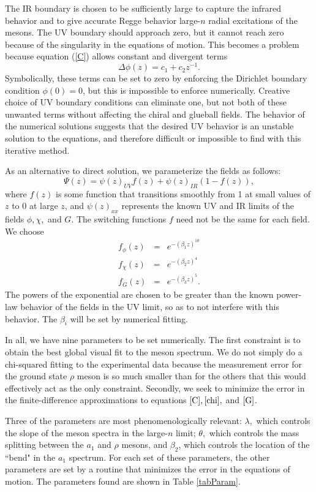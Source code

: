 \documentclass[aps,prd,12pt,nofootinbib]{revtex4}
\newcommand{\be}{\begin{equation}}
\newcommand{\ee}{\end{equation}}
\newcommand{\ba}{\begin{eqnarray}}
\newcommand{\ea}{\end{eqnarray}}
\begin{document}
The IR boundary is chosen to be sufficiently large to capture the infrared behavior and to give accurate Regge behavior large-$n$ radial excitations of the mesons. 
The UV boundary should approach zero, but it cannot reach zero because of the singularity in the equations of motion. 
This becomes a problem because equation (\ref{C}) allows constant and divergent terms 
\be
\Delta \phi(z) = c_1 + c_2 z^{-1}.
\ee
Symbolically, these terms can be set to zero by enforcing the Dirichlet boundary condition $\phi(0)=0$, but this is impossible to enforce numerically. 
Creative choice of UV boundary conditions can eliminate one, but not both of these unwanted terms without affecting the chiral and glueball fields. 
The behavior of the numerical solutions suggests that the desired UV behavior is an unstable solution to the equations, and therefore difficult or impossible to find with this iterative method.

As an alternative to direct solution, we parameterize the fields as follows:
\be
\Psi(z) = \psi(z)_{UV} f(z) + \psi(z)_{IR} \left(1-f(z)\right),
\ee
where $f(z)$ is some function that transitions smoothly from 1 at small values of $z$ to 0 at large $z$, and $\psi(z)_{xx}$ represents the known UV and IR limits of the fields $\phi, \chi,$ and $G$. 
The switching functions $f$ need not be the same for each field. We choose 
\ba
f_\phi(z)&=&e^{-(\beta_1z)^{10}}\\ \label{param1}
f_\chi(z)&=&e^{-(\beta_2z)^4}\\  \label{param2}
f_G(z)&=&e^{-(\beta_3z)^5}. \label{param3}
\ea
The powers of the exponential are chosen to be greater than the known power-law behavior of the fields in the UV limit, so as to not interfere with this behavior. 
The $\beta_i$ will be set by numerical fitting.

In all, we have nine parameters to be set numerically. 
The first constraint is to obtain the best global visual fit to the meson spectrum. 
We do not simply do a chi-squared fitting to the experimental data because the measurement error for the ground state $\rho$ meson is so much smaller than for the others that this would effectively act as the only constraint. 
Secondly, we seek to minimize the error in the finite-difference approximations to equations $\ref{C}, \ref{chi},$ and $\ref{G}$. 

Three of the parameters are most phenomenologically relevant: $\lambda,$ which controls the slope of the meson spectra in the large-$n$ limit; $\theta,$ which controls the mass splitting between the $a_1$ and $\rho$ mesons, and $\beta_2$, which controls the location of the ``bend" in the $a_1$ spectrum.
For each set of these parameters, the other parameters are set by a routine that minimizes the error in the equations of motion. 
The parameters found are shown in Table \ref{tabParam}.
\end{document}
